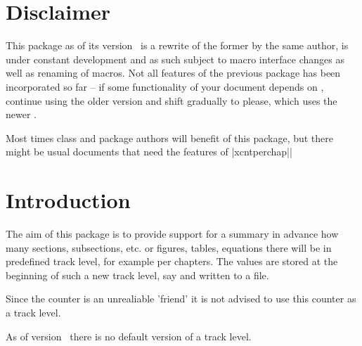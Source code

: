 \documentclass[12pt,a4paper]{article}
\newcommand{\PackageDocName}{xcntperchap}%
\def\packageversion{\xcntperchappackageversion}%
\begin{document}
\mmddyyyydate


\setlength{\parindent}{0pt}

\thispagestyle{empty}%
\clearpage
\tableofcontents
\clearpage

\CHDocConventions
\clearpage

\pagestyle{plain}

\setcounter{footnote}{0}

\pagestyle{plain}



\section{Disclaimer}
This package as of its version \packageversion\ is a rewrite of the former  by the same author, is under constant development and as such subject to macro interface changes as well as renaming of macros. Not all features of the previous package has been incorporated so far -- if some functionality of your document depends on , continue using the older version and shift gradually to \CHDocPackage{\PackageDocName} please, which uses the newer . 

\begin{marker}
Most times class and package authors will benefit of this package, but there might be usual documents that need the features of |\PackageDocName||
\end{marker}

\section{Introduction}

The aim of this package is to provide support for a summary in advance how many sections, subsections, etc. or figures, tables, equations there will be in predefined track level, for example per chapters. The values are stored at the beginning of such a new track level, say  and written to a  file.

\begin{marker}
  Since the  counter is an unrealiable 'friend' it is not advised to use this counter as a track level. 
\end{marker}


As of version \packageversion\ there is no default version of a track level.
\end{document}
